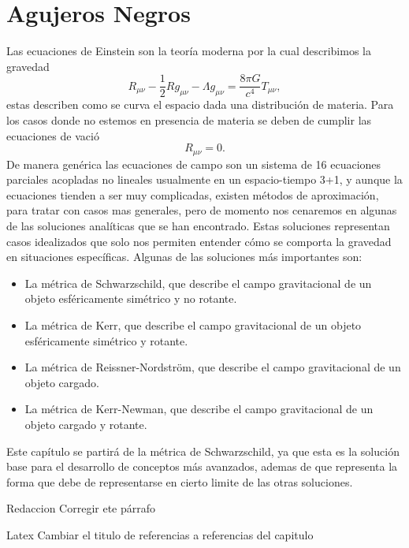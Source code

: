 \chapter{Agujeros Negros}

Las ecuaciones de Einstein son la teoría moderna por la cual describimos la gravedad 
\begin{equation}
    R_{\mu \nu}-\frac{1}{2} R g_{\mu \nu}-\Lambda g_{\mu \nu} = \frac{8 \pi G}{c^4} T_{\mu \nu},
    \label{EinsteinFieldEquations}
\end{equation}
estas describen como se curva el espacio dada una distribución de materia. Para los casos donde no estemos en presencia de materia se deben de cumplir las ecuaciones de vació
\begin{equation}
    R_{\mu \nu} = 0.
    \label{vacuumFieldEquations}
\end{equation}
De manera genérica las ecuaciones de campo son un sistema de 16 ecuaciones parciales acopladas no lineales usualmente en un espacio-tiempo 3+1,  y aunque la ecuaciones tienden a ser muy complicadas, existen métodos de aproximación, para tratar con casos mas generales, pero de momento nos cenaremos en algunas de las  soluciones analíticas que se han encontrado. Estas soluciones representan casos idealizados que solo  nos permiten entender cómo se comporta la gravedad en situaciones específicas. Algunas de las soluciones más importantes son:

\begin{itemize}
    \item La métrica de Schwarzschild, que describe el campo gravitacional de un objeto esféricamente simétrico y no rotante.
    \item La métrica de Kerr, que describe el campo gravitacional de un objeto esféricamente simétrico y rotante.
    \item La métrica de Reissner-Nordström, que describe el campo gravitacional de un objeto cargado.
    \item La métrica de Kerr-Newman, que describe el campo gravitacional de un objeto cargado y rotante.
\end{itemize}
Este capítulo se partirá de la métrica de Schwarzschild, ya que esta es la solución base para el desarrollo de conceptos más avanzados, ademas de que representa la forma que debe de representarse en cierto limite de las otras soluciones.

\begin{task}{Redaccion}{}
Corregir ete párrafo
\end{task}








\printbibliography[keyword={BlackHoles},heading=subbibliography]

\begin{task}{Latex}{}
Cambiar el titulo de referencias a referencias del capitulo    
\end{task}
\nocite{*}
